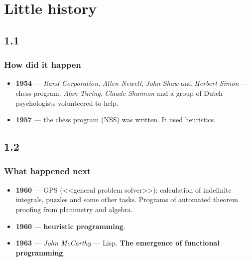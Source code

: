 \documentclass[default]{beamer}
\begin{document}
	\section{Little history}
	\subsection{1.1}
	\begin{frame}
		\frametitle{How did it happen}

		\begin{itemize}
			\item \textbf{1954} --- \textit{Rand Corporation}, \textit{Allen Newell}, \textit{John Shaw} and \textit{Herbert Simon}  --- chess program. \textit{Alan Turing}, \textit{Claude Shannon} and a group of Dutch psychologists volunteered to help.
			\item \textbf{1957} --- the chess program (NSS) was written. It used heuristics.
		\end{itemize}
	\end{frame}
	\subsection{1.2}
	\begin{frame}
	\frametitle{What happened next}
	
		\begin{itemize}
			\item \textbf{1960}  --- GPS (<<general problem solver>>): calculation of indefinite integrals, puzzles and some other tasks.  Programs of automated theorem proofing from planimetry and algebra. 
			\item \textbf{1960} --- \textbf{heuristic programming}. 
			\item \textbf{1963} --- \textit{John McCarthy} --- Lisp. \textbf{The emergence of functional programming}.
		\end{itemize}
	\end{frame}
\end{document}
